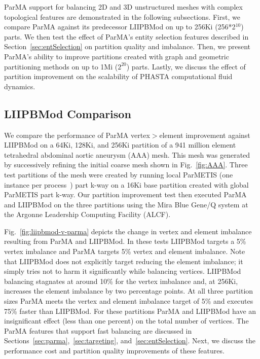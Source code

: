ParMA support for balancing 2D and 3D unstructured meshes with complex
topological features are demonstrated in the following subsections.
First, we compare ParMA against its predecessor LIIPBMod on up to 256Ki
(256*2$^{10}$) parts.
We then test the effect of ParMA's entity selection features described
in Section~\ref{sec:entSelection} on partition quality and imbalance.
Then, we present ParMA's ability to improve partitions created with graph and
geometric partitioning methods on up to 1Mi ($2^{20}$) parts.
Lastly, we discuss the effect of partition improvement on the scalability of
PHASTA computational fluid dynamics.

\subsection{LIIPBMod Comparison} \label{sec:liipbmodComparison}

We compare the performance of ParMA vertex$>$element improvement against
LIIPBMod on a 64Ki, 128Ki, and 256Ki partition of a 941 million element
tetrahedral abdominal aortic aneurysm (AAA) mesh.
This mesh was generated by successively refining the initial coarse mesh shown
in Fig.~\ref{fig:AAA}.
Three test partitions of the mesh were created by running local ParMETIS (one
instance per process~\cite{Zhou2010}) part k-way on a 16Ki base partition
created with global ParMETIS part k-way.
Our partition improvement test then executed ParMA and LIIPBMod on the three
partitions using the Mira Blue Gene/Q system at the Argonne
Leadership Computing Facility (ALCF).

Fig.~\ref{fig:liipbmod-v-parma} depicts the change in vertex and element
imbalance resulting from ParMA and LIIPBMod.
In these tests LIIPBMod targets a 5\% vertex imbalance and ParMA targets 5\%
vertex and element imbalance.
Note that LIIPBMod does not explicitly target reducing the
element imbalance; it simply tries not to harm it significantly while balancing
vertices.
LIIPBMod balancing stagnates at around 10\% for the vertex imbalance and, at
256Ki, increases the element imbalance by two percentage points.
At all three partition sizes ParMA meets the vertex and element imbalance target
of 5\% and executes 75\% faster than LIIPBMod.
For these partitions ParMA and LIIPBMod have an insignificant effect (less than
one percent) on the total number of vertices.
The ParMA features that support fast balancing are discussed in
Sections~\ref{sec:parma},~\ref{sec:targeting}, and~\ref{sec:entSelection}.
Next, we discuss the performance cost and partition quality improvements
of these features.


